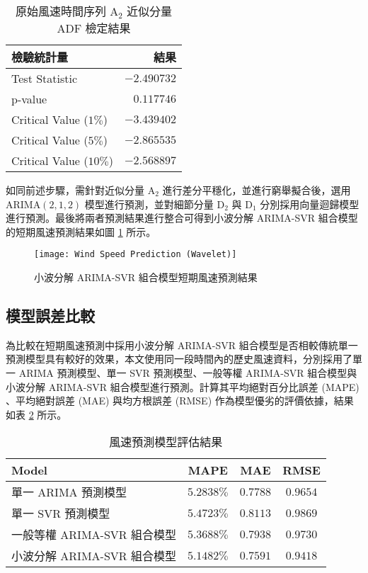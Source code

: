 \begin{table}[htbp]
  \centering
  \caption[原始風速時間序列 $\text{A}_2$ 近似分量 ADF 檢定結果]{原始風速時間序列 $\text{A}_2$ 近似分量 ADF 檢定結果}
  \begin{tabular}{lr}
    \toprule
    \textbf{檢驗統計量}     & \textbf{結果} \\
    \midrule
    Test Statistic          & $-2.490732$ \\
    p-value                 & $0.117746$ \\
    Critical Value ($1\%$)  & $-3.439402$ \\
    Critical Value ($5\%$)  & $-2.865535$ \\
    Critical Value ($10\%$) & $-2.568897$ \\
    \bottomrule
  \end{tabular}
  \label{table: A2 ADF Result}
\end{table}

如同前述步驟，需針對近似分量 $\text{A}_2$ 進行差分平穩化，並進行窮舉擬合後，選用 $\text{ARIMA} (2, 1, 2)$ 模型進行預測，並對細節分量 $\text{D}_2$ 與 $\text{D}_1$ 分別採用向量迴歸模型進行預測。最後將兩者預測結果進行整合可得到小波分解 ARIMA-SVR 組合模型的短期風速預測結果如圖 \ref{figure: Wind Speed Prediction Wavelet} 所示。

\begin{figure}[htbp]
  \centering
  \texttt{[image: Wind Speed Prediction (Wavelet)]}
  \caption{小波分解 ARIMA-SVR 組合模型短期風速預測結果}
  \label{figure: Wind Speed Prediction Wavelet}
\end{figure}

\subsection{模型誤差比較}

為比較在短期風速預測中採用小波分解 ARIMA-SVR 組合模型是否相較傳統單一預測模型具有較好的效果，本文使用同一段時間內的歷史風速資料，分別採用了單一 ARIMA 預測模型、單一 SVR 預測模型、一般等權 ARIMA-SVR 組合模型與小波分解 ARIMA-SVR 組合模型進行預測。計算其平均絕對百分比誤差 (MAPE) 、平均絕對誤差 (MAE) 與均方根誤差 (RMSE) 作為模型優劣的評價依據，結果如表 \ref{table: Time Series Model Result} 所示。

\begin{table}[htbp]
  \centering
  \caption[風速預測模型評估結果]{風速預測模型評估結果}
  \begin{tabular}{lccc}
    \toprule
    \textbf{Model}              & \textbf{MAPE} & \textbf{MAE} & \textbf{RMSE} \\
    \midrule
    單一 ARIMA 預測模型         & $5.2838 \%$   & $0.7788$     & $0.9654$ \\
    單一 SVR 預測模型           & $5.4723 \%$   & $0.8113$     & $0.9869$ \\
    一般等權 ARIMA-SVR 組合模型 & $5.3688 \%$   & $0.7938$     & $0.9730$ \\
    小波分解 ARIMA-SVR 組合模型 & $5.1482 \%$   & $0.7591$     & $0.9418$ \\
    \bottomrule
  \end{tabular}
  \label{table: Time Series Model Result}
\end{table}

